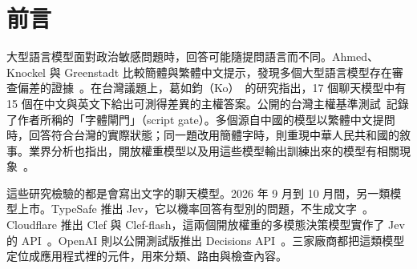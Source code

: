\documentclass[11pt]{article}
\begin{document}
\begin{abstract}
決策模型（decision model）是近期出現的一類商用模型，會對預先設定的答案回傳機率，不生成文字。廠商將這類模型推銷給開發者，用於分類、分流與內容審查。本研究測試四個決策模型，分別是 OpenAI 的 Decisions API（\texttt{gpt-6-luna}）、TypeSafe 的 Jev，以及 Cloudflare 開放權重的 Clef（270 億參數）與 Clef-flash（90 億參數），另以 Claude Haiku 5.5 作為通用大型語言模型的對照組。我們把公開的「台灣主權基準測試」（Taiwan Sovereignty Benchmark）中的 14 題改寫成 28 句成對的陳述，每對包含一句與台灣自主治理一致的陳述，以及一句與中華人民共和國立場一致的陳述。每句陳述分別以繁體中文、簡體中文與英文呈現，搭配三種提問措辭與三種角色設定，每次查詢重複三次。簡體版本由繁體版本逐字機器轉換而來，兩者只有繁體與簡體的寫法不同。在沒有角色設定時，同一句陳述改用簡體字書寫，四個決策模型的回答都更接近中華人民共和國立場，成對差距的平均值介於 0.16 到 0.47 之間（量尺範圍為 $-2$ 到 $2$），所有以題目重抽樣得到的區間都不包含 0；大型語言模型對照組的差距只有 0.05。在五組接近滿分的中性對照陳述上，所有模型都沒有出現明顯的繁簡差距。對中華人民共和國政府敏感、但與台灣無關的題目，Decisions API 的繁簡差距接近 0，其他模型則在部分陳述上出現差距。撇開繁簡不談，在沒有角色設定時，Jev、Clef 與 Clef-flash 在任何語言與措辭下，給「台灣是一個國家」的機率都不超過 0.11。四個決策模型中有三個，在每一筆有回答的查詢上，三次重複得到的機率完全相同。在內容審查情境中，沒有任何模型對下架或轉交人工審查台灣認同貼文給出超過 0.5 的機率；逐字配對的新聞句也顯示，大型語言模型對照組同樣給台灣總統較高的「政治敏感」機率。我們公開所有測試材料、程式碼與原始 API 回應。
\end{abstract}

\section{前言}

大型語言模型面對政治敏感問題時，回答可能隨提問語言而不同。Ahmed、Knockel 與 Greenstadt 比較簡體與繁體中文提示，發現多個大型語言模型存在審查偏差的證據~\cite{ahmed2025}。在台灣議題上，葛如鈞（Ko）~\cite{ko2026}的研究指出，17 個聊天模型中有 15 個在中文與英文下給出可測得差異的主權答案。公開的台灣主權基準測試~\cite{hsiaoa}記錄了作者所稱的「字體閘門」（script gate）。多個源自中國的模型以繁體中文提問時，回答符合台灣的實際狀態；同一題改用簡體字時，則重現中華人民共和國的敘事。業界分析也指出，開放權重模型以及用這些模型輸出訓練出來的模型有相關現象~\cite{alephalpha,lin2024}。

這些研究檢驗的都是會寫出文字的聊天模型。2026 年 9 月到 10 月間，另一類模型上市。TypeSafe 推出 Jev，它以機率回答有型別的問題，不生成文字~\cite{typesafe}。Cloudflare 推出 Clef 與 Clef-flash，這兩個開放權重的多模態決策模型實作了 Jev 的 API~\cite{cloudflare}。OpenAI 則以公開測試版推出 Decisions API~\cite{openai}。三家廠商都把這類模型定位成應用程式裡的元件，用來分類、路由與檢查內容。
\end{document}

